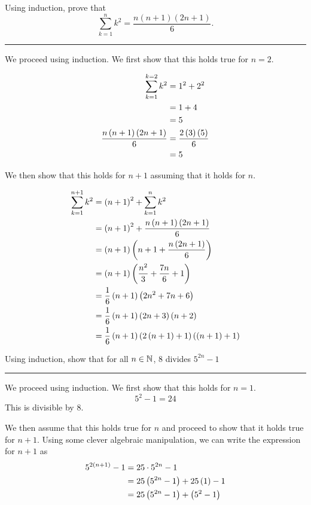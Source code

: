 \documentclass{article}
\begin{document}
\problem{}
Using induction, prove that \[\sum_{k=1}^n k^2=\frac{n(n+1)(2n+1)}{6}.\]
\hrule

We proceed using induction.
We first show that this holds true for $n=2$.

\begin{align*}
  \sum \limits_{k=1}^{k=2} k^2 &= 1^2 + 2^2 \\
                               &= 1 + 4 \\
                               &= 5 \\
  \frac{n \left (n+1 \right) \left (2n+1 \right)}{6} &= \frac{2 \left (3 \right) \left (5 \right)}{6} \\
                               &= 5 \\
\end{align*}

We then show that this holds for $n+1$ assuming that it holds for $n$.

\begin{align*}
  \sum \limits_{k=1}^{n+1} k^2 &= \left (n+1 \right)^2 + \sum \limits_{k=1}^{n} k^2 \\
                               &= \left (n+1 \right)^2 + \frac{n \left (n+1 \right) \left (2n+1 \right)}{6} \\
                               &= \left (n+1 \right) \left (n+1 + \frac{n \left (2n+1 \right)}{6} \right) \\
                               &= \left (n+1 \right) \left (\frac{n^2}{3} + \frac{7n}{6} + 1 \right) \\
                               &= \frac{1}{6} \left (n+1 \right) \left (2n^2 + 7n + 6 \right) \\
                               &= \frac{1}{6} \left (n+1 \right) \left (2n+3 \right) \left (n+2 \right) \\
                               &= \frac{1}{6} \left (n+1 \right) \left (2 \left (n+1 \right) + 1 \right) \left (\left (n+1 \right) + 1 \right)
\end{align*}

\problem
Using induction, show that for all $n \in \mathbb N$, $8$ divides $5^{2n} - 1$
\hrule
We proceed using induction.
We first show that this holds for $n=1$.
$$5^2 - 1 = 24$$
This is divisible by $8$.

We then assume that this holds true for $n$ and proceed to show that it holds true for $n+1$.
Using some clever algebraic manipulation, we can write the expression for $n+1$ as
\begin{align*}
  5^{2 \left (n+1 \right)} - 1 &= 25 \cdot 5^{2n} - 1 \\
                       &= 25 \left (5^{2n} - 1 \right) + 25 \left (1 \right) - 1 \\
                       &= 25 \left (5^{2n} - 1 \right) + \left (5^2 - 1 \right) \\
\end{align*}
\end{document}
